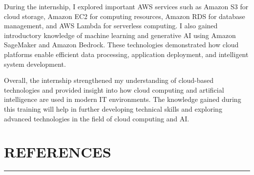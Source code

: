 \documentclass[12pt, a4paper, oneside]{report}
\begin{document}
During the internship, I explored important AWS services such as Amazon S3 for cloud 
storage, Amazon EC2 for computing resources, Amazon RDS for database management, 
and AWS Lambda for serverless computing. I also gained introductory knowledge of 
machine learning and generative AI using Amazon SageMaker and Amazon Bedrock. 
These technologies demonstrated how cloud platforms enable efficient data processing, 
application deployment, and intelligent system development.

Overall, the internship strengthened my understanding of cloud-based technologies and 
provided insight into how cloud computing and artificial intelligence are used in modern 
IT environments. The knowledge gained during this training will help in further 
developing technical skills and exploring advanced technologies in the field of cloud 
computing and AI.


\chapter*{REFERENCES}
\thispagestyle{fancy}

\begin{center}
    \rule{\linewidth}{0.4pt}
\end{center}
\end{document}

